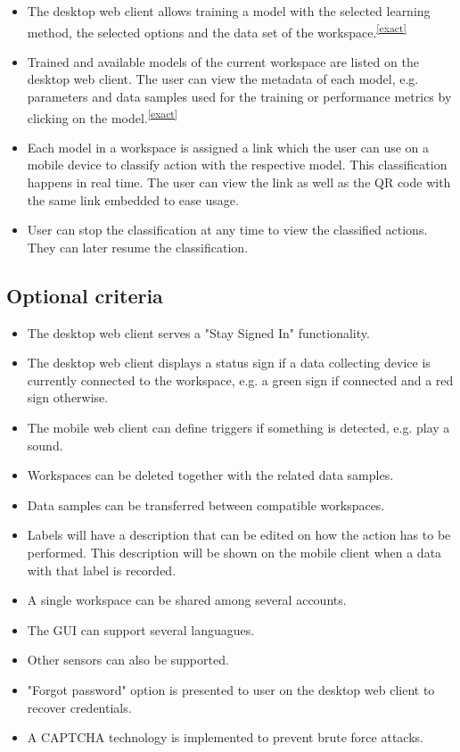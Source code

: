 \begin{itemize}
    \item The desktop web client allows training a model with the selected learning method, the selected options and the data set of the workspace.\textsuperscript{\ref{exact}}
    \item Trained and available models of the current workspace are listed on the desktop web client. The user can view the metadata of each model, e.g. parameters and data samples used for the training or performance metrics by clicking on the model.\textsuperscript{\ref{exact}}
    \item Each model in a workspace is assigned a link which the user can use on a mobile device to classify action with the respective model. This \gls{classification} happens in real time. The user can view the link as well as the QR code with the same link embedded to ease usage. 
    \item User can stop the classification at any time to view the classified actions. They can later resume the classification.   
\end{itemize}

\subsection{Optional criteria}
\begin{itemize}
    \item The desktop web client serves a "Stay Signed In" functionality.
    \item The desktop web client displays a status sign if a data collecting device is currently connected to the workspace, e.g. a green sign if connected and a red sign otherwise.
    \item The mobile web client can define triggers if something is detected, e.g. play a sound.
    \item Workspaces can be deleted together with the related data samples.
    \item Data samples can be transferred between compatible workspaces.
    \item Labels will have a description that can be edited on how the action has to be performed. This description will be shown on the mobile client when a data with that label is recorded.
    \item A single workspace can be shared among several accounts.
    \item The GUI can support several languagues.
    \item Other sensors can also be supported.
    \item "Forgot password" option is presented to user on the desktop web client to recover credentials.
    \item A CAPTCHA technology is implemented to prevent brute force attacks.
\end{itemize}


